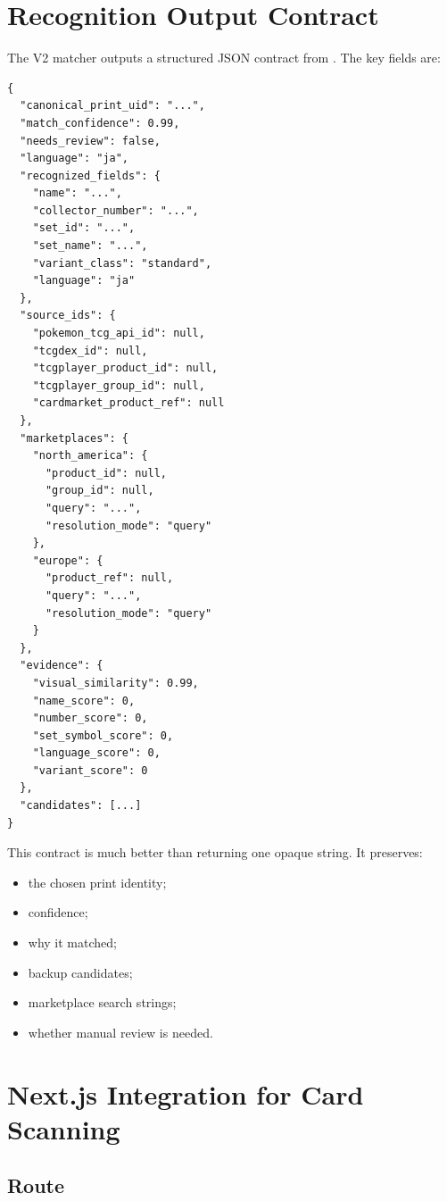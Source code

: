 \documentclass[11pt,a4paper]{article}
\begin{document}
\section{Recognition Output Contract}

The V2 matcher outputs a structured JSON contract from . The key fields are:

\begin{lstlisting}
{
  "canonical_print_uid": "...",
  "match_confidence": 0.99,
  "needs_review": false,
  "language": "ja",
  "recognized_fields": {
    "name": "...",
    "collector_number": "...",
    "set_id": "...",
    "set_name": "...",
    "variant_class": "standard",
    "language": "ja"
  },
  "source_ids": {
    "pokemon_tcg_api_id": null,
    "tcgdex_id": null,
    "tcgplayer_product_id": null,
    "tcgplayer_group_id": null,
    "cardmarket_product_ref": null
  },
  "marketplaces": {
    "north_america": {
      "product_id": null,
      "group_id": null,
      "query": "...",
      "resolution_mode": "query"
    },
    "europe": {
      "product_ref": null,
      "query": "...",
      "resolution_mode": "query"
    }
  },
  "evidence": {
    "visual_similarity": 0.99,
    "name_score": 0,
    "number_score": 0,
    "set_symbol_score": 0,
    "language_score": 0,
    "variant_score": 0
  },
  "candidates": [...]
}
\end{lstlisting}

This contract is much better than returning one opaque string. It preserves:

\begin{itemize}
  \item the chosen print identity;
  \item confidence;
  \item why it matched;
  \item backup candidates;
  \item marketplace search strings;
  \item whether manual review is needed.
\end{itemize}

\section{Next.js Integration for Card Scanning}

\subsection{Route}
\end{document}
